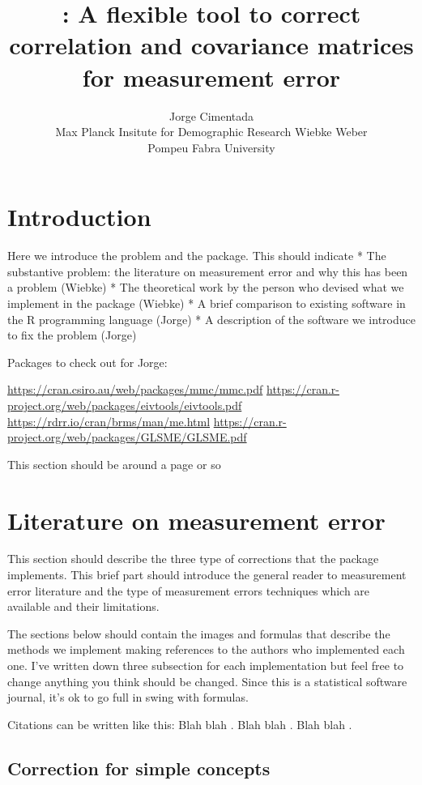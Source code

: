 \documentclass[
]{jss}
\author{
Jorge Cimentada\\Max Planck Insitute for Demographic Research \And Wiebke Weber\\Pompeu Fabra University
}
\title{\pkg{measurementerror}: A flexible tool to correct correlation and
covariance matrices for measurement error}
\begin{document}
\hypertarget{introduction}{%
\section{Introduction}\label{introduction}}

Here we introduce the problem and the package. This should indicate *
The substantive problem: the literature on measurement error and why
this has been a problem (Wiebke) * The theoretical work by the person
who devised what we implement in the package (Wiebke) * A brief
comparison to existing software in the R programming language (Jorge) *
A description of the software we introduce to fix the problem (Jorge)

Packages to check out for Jorge:

\url{https://cran.csiro.au/web/packages/mmc/mmc.pdf}
\url{https://cran.r-project.org/web/packages/eivtools/eivtools.pdf}
\url{https://rdrr.io/cran/brms/man/me.html}
\url{https://cran.r-project.org/web/packages/GLSME/GLSME.pdf}

This section should be around a page or so

\hypertarget{literature-on-measurement-error}{%
\section{Literature on measurement
error}\label{literature-on-measurement-error}}

This section should describe the three type of corrections that the
package implements. This brief part should introduce the general reader
to measurement error literature and the type of measurement errors
techniques which are available and their limitations.

The sections below should contain the images and formulas that describe
the methods we implement making references to the authors who
implemented each one. I've written down three subsection for each
implementation but feel free to change anything you think should be
changed. Since this is a statistical software journal, it's ok to go
full in swing with formulas.

Citations can be written like this: Blah blah
\citetext{\citealp[see][pp.~33-35]{alwin2007}; \citealp[also][ch.~1]{scherpenzeel1997}}.
Blah blah \citep[pp.~33-35, 38-39 and \emph{passim}]{alwin2007}. Blah
blah \citep{alwin2007, scherpenzeel1997}.

\hypertarget{correction-for-simple-concepts}{%
\subsection{Correction for simple
concepts}\label{correction-for-simple-concepts}}
\end{document}
